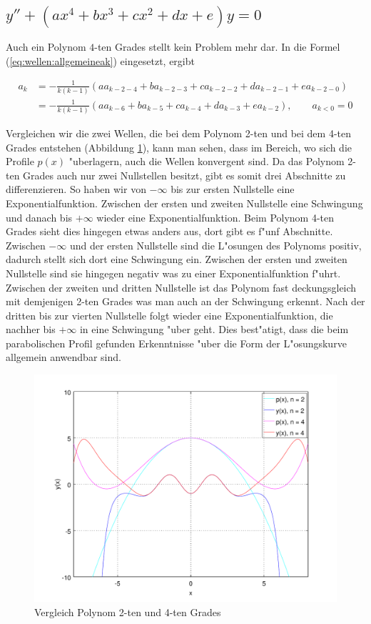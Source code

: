 \subsection{\texorpdfstring{$y''+(ax^4+bx^3+cx^2+dx+e)y = 
0$}{y''-(ax4+bx3+cx2+dx+e)y = 0}}

Auch ein Polynom $4$-ten Grades stellt kein Problem mehr dar. In die 
Formel (\ref{eq:wellen:allgemeineak}) eingesetzt, ergibt

\begin{equation*}
	\begin{split}
		a_k &= -\frac{1}{k(k-1)} (aa_{k-2-4} + 
		ba_{k-2-3} + ca_{k-2-2} + da_{k-2-1} +ea_{k-2-0})
		\\
		&= -\frac{1}{k(k-1)} (aa_{k-6} + ba_{k-5} + 
		ca_{k-4} + da_{k-3} +ea_{k-2}), \qquad a_{k<0} = 0
	\end{split}
\end{equation*}

Vergleichen wir die zwei Wellen, die bei dem Polynom 2-ten und bei dem 
4-ten Grades entstehen (Abbildung \ref{fig:wellen:poly4-dgl}), kann man sehen, 
dass im Bereich, wo sich die Profile $p(x)$ "uberlagern, auch die Wellen 
konvergent sind. Da das Polynom 2-ten Grades auch nur zwei Nullstellen besitzt, 
gibt es somit drei Abschnitte zu differenzieren. So haben wir von $-\infty$ bis 
zur ersten Nullstelle eine Exponentialfunktion. Zwischen der ersten und zweiten 
Nullstelle eine Schwingung und danach bis $+\infty$ wieder eine 
Exponentialfunktion. Beim Polynom 4-ten Grades sieht dies hingegen etwas anders 
aus, dort gibt es f"unf Abschnitte. Zwischen $-\infty$ und der ersten 
Nullstelle sind die L"osungen des Polynoms positiv, dadurch stellt sich dort 
eine Schwingung ein. Zwischen der ersten und zweiten Nullstelle sind sie 
hingegen negativ was zu einer Exponentialfunktion f"uhrt. Zwischen der zweiten 
und dritten Nullstelle ist das Polynom fast deckungsgleich mit demjenigen 2-ten 
Grades was man auch an der Schwingung erkennt. Nach der dritten bis zur vierten 
Nullstelle folgt wieder eine Exponentialfunktion, die nachher bis $+\infty$ in 
eine Schwingung "uber geht. Dies best"atigt, dass die beim parabolischen Profil 
gefunden Erkenntnisse "uber die Form der L"osungskurve allgemein anwendbar sind.

\begin{figure}
	\includegraphics[scale=0.65]{./wellen/images/allgemein/n4.pdf}
	\caption{Vergleich Polynom 2-ten und 4-ten Grades}
	\label{fig:wellen:poly4-dgl}
\end{figure}